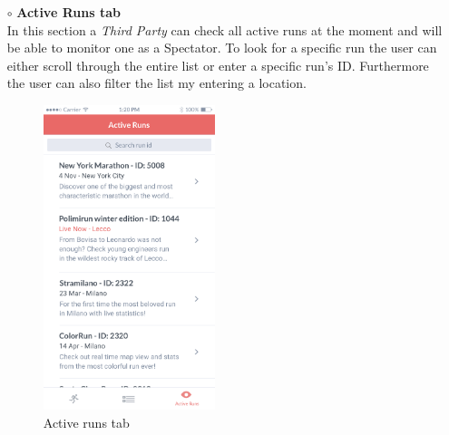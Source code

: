 \documentclass[titlepage]{article}
\begin{document}
\begin{itemize}
\begin{itemize}
\begin{itemize}
					\item[$\circ$] {\bf Active Runs tab} \\
					In this section a {\it Third Party} can check all active runs at the moment and will be able to monitor one as a Spectator. To look for a specific run the user can either scroll through the entire list or enter a specific run’s ID. Furthermore the user can also filter the list my entering a location.\\
					\begin{figure}[H]
						\center
  						\includegraphics[width=5cm]{Mockup/mockupActiveRuns.png}
  						\caption{Active runs tab}
 					 	\label{fig:Active runs}
					\end{figure}


\end{itemize}
\end{itemize}
\end{itemize}
\end{document}
